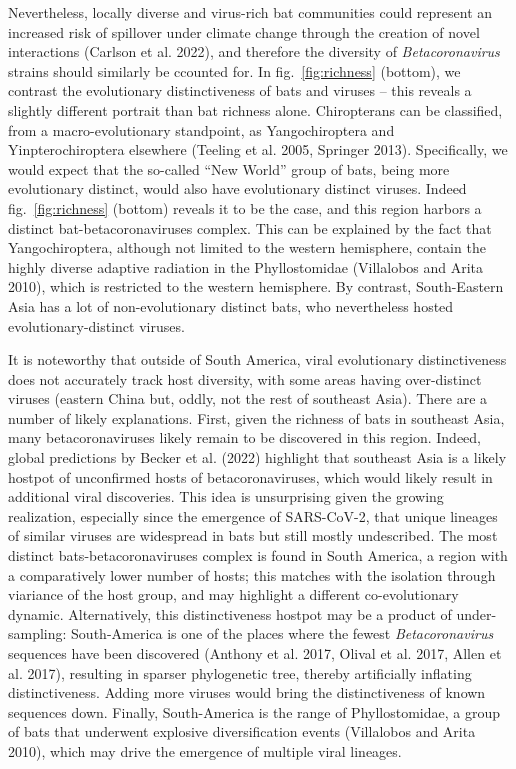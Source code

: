 \documentclass[11pt]{article}
\begin{document}
Nevertheless, locally diverse and virus-rich bat communities could
represent an increased risk of spillover under climate change through
the creation of novel interactions (Carlson et al. 2022), and therefore
the diversity of \emph{Betacoronavirus} strains should similarly be
ccounted for. In fig.~\ref{fig:richness} (bottom), we contrast the
evolutionary distinctiveness of bats and viruses -- this reveals a
slightly different portrait than bat richness alone. Chiropterans can be
classified, from a macro-evolutionary standpoint, as Yangochiroptera and
Yinpterochiroptera elsewhere (Teeling et al. 2005, Springer 2013).
Specifically, we would expect that the so-called ``New World'' group of
bats, being more evolutionary distinct, would also have evolutionary
distinct viruses. Indeed fig.~\ref{fig:richness} (bottom) reveals it to
be the case, and this region harbors a distinct bat-betacoronaviruses
complex. This can be explained by the fact that Yangochiroptera,
although not limited to the western hemisphere, contain the highly
diverse adaptive radiation in the Phyllostomidae (Villalobos and Arita
2010), which is restricted to the western hemisphere. By contrast,
South-Eastern Asia has a lot of non-evolutionary distinct bats, who
nevertheless hosted evolutionary-distinct viruses.

It is noteworthy that outside of South America, viral evolutionary
distinctiveness does not accurately track host diversity, with some
areas having over-distinct viruses (eastern China but, oddly, not the
rest of southeast Asia). There are a number of likely explanations.
First, given the richness of bats in southeast Asia, many
betacoronaviruses likely remain to be discovered in this region. Indeed,
global predictions by Becker et al. (2022) highlight that southeast Asia
is a likely hostpot of unconfirmed hosts of betacoronaviruses, which
would likely result in additional viral discoveries. This idea is
unsurprising given the growing realization, especially since the
emergence of SARS-CoV-2, that unique lineages of similar viruses are
widespread in bats but still mostly undescribed. The most distinct
bats-betacoronaviruses complex is found in South America, a region with
a comparatively lower number of hosts; this matches with the isolation
through viariance of the host group, and may highlight a different
co-evolutionary dynamic. Alternatively, this distinctiveness hostpot may
be a product of under-sampling: South-America is one of the places where
the fewest \emph{Betacoronavirus} sequences have been discovered
(Anthony et al. 2017, Olival et al. 2017, Allen et al. 2017), resulting
in sparser phylogenetic tree, thereby artificially inflating
distinctiveness. Adding more viruses would bring the distinctiveness of
known sequences down. Finally, South-America is the range of
Phyllostomidae, a group of bats that underwent explosive diversification
events (Villalobos and Arita 2010), which may drive the emergence of
multiple viral lineages.
\end{document}
